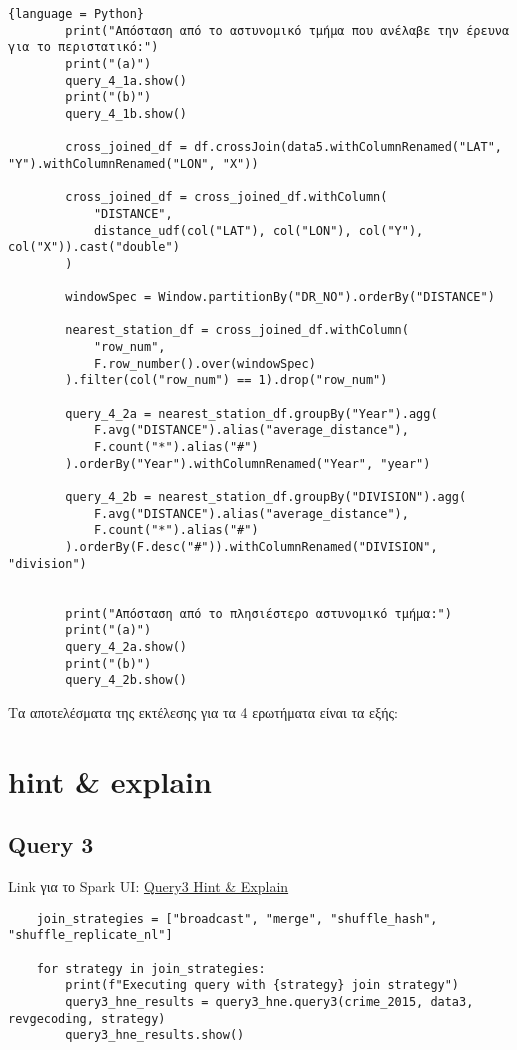 \documentclass{article}
\begin{document}
\begin{lstlisting}{language = Python}
        print("Απόσταση από το αστυνομικό τμήμα που ανέλαβε την έρευνα για το περιστατικό:")
        print("(a)")
        query_4_1a.show() 
        print("(b)")
        query_4_1b.show() 

        cross_joined_df = df.crossJoin(data5.withColumnRenamed("LAT", "Y").withColumnRenamed("LON", "X"))

        cross_joined_df = cross_joined_df.withColumn(
            "DISTANCE",
            distance_udf(col("LAT"), col("LON"), col("Y"), col("X")).cast("double")
        )

        windowSpec = Window.partitionBy("DR_NO").orderBy("DISTANCE")

        nearest_station_df = cross_joined_df.withColumn(
            "row_num",
            F.row_number().over(windowSpec)
        ).filter(col("row_num") == 1).drop("row_num")

        query_4_2a = nearest_station_df.groupBy("Year").agg(
            F.avg("DISTANCE").alias("average_distance"),
            F.count("*").alias("#")
        ).orderBy("Year").withColumnRenamed("Year", "year")

        query_4_2b = nearest_station_df.groupBy("DIVISION").agg(
            F.avg("DISTANCE").alias("average_distance"),
            F.count("*").alias("#")
        ).orderBy(F.desc("#")).withColumnRenamed("DIVISION", "division")


        print("Απόσταση από το πλησιέστερο αστυνομικό τμήμα:")
        print("(a)")
        query_4_2a.show()
        print("(b)")
        query_4_2b.show()
\end{lstlisting}

Τα αποτελέσματα της εκτέλεσης για τα 4 ερωτήματα είναι τα εξής: 


\section*{hint \& explain}

\subsection*{Query 3}
Link για το Spark UI:
\href{http://83.212.81.191:18080/history/application_1705357398960_0018/jobs/} {Query3 Hint \& Explain}
\begin{lstlisting}
    join_strategies = ["broadcast", "merge", "shuffle_hash", "shuffle_replicate_nl"]

    for strategy in join_strategies:
        print(f"Executing query with {strategy} join strategy")
        query3_hne_results = query3_hne.query3(crime_2015, data3, revgecoding, strategy)
        query3_hne_results.show()
\end{lstlisting}
\end{document}
